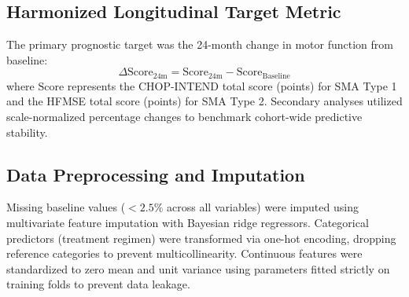 \documentclass[journal]{IEEEtran}
\begin{document}
\subsection{Harmonized Longitudinal Target Metric}
The primary prognostic target was the 24-month change in motor function from baseline:
\begin{equation}
\Delta\text{Score}_{24\text{m}} = \text{Score}_{24\text{m}} - \text{Score}_{\text{Baseline}}
\end{equation}
where $\text{Score}$ represents the CHOP-INTEND total score (points) for SMA Type 1 and the HFMSE total score (points) for SMA Type 2. Secondary analyses utilized scale-normalized percentage changes to benchmark cohort-wide predictive stability.

\subsection{Data Preprocessing and Imputation}
Missing baseline values ($< 2.5\%$ across all variables) were imputed using multivariate feature imputation with Bayesian ridge regressors. Categorical predictors (treatment regimen) were transformed via one-hot encoding, dropping reference categories to prevent multicollinearity. Continuous features were standardized to zero mean and unit variance using parameters fitted strictly on training folds to prevent data leakage.
\end{document}

